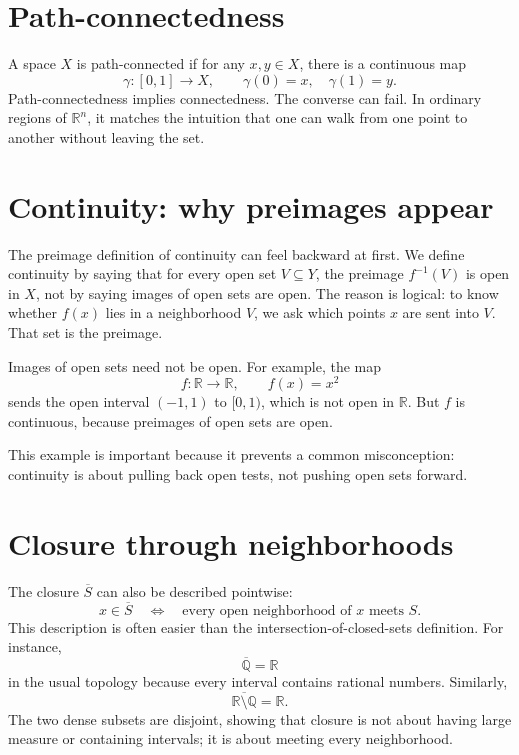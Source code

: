 \section{Path-connectedness}

A space \(X\) is path-connected if for any \(x,y\in X\), there is a continuous map
\[
  \gamma:[0,1]\to X,\qquad \gamma(0)=x,\quad \gamma(1)=y.
\]
Path-connectedness implies connectedness.  The converse can fail.  In ordinary regions of \(\mathbb R^n\), it matches the intuition that one can walk from one point to another without leaving the set.


\section{Continuity: why preimages appear}

The preimage definition of continuity can feel backward at first.  We define continuity by saying that for every open set \(V\subseteq Y\), the preimage \(f^{-1}(V)\) is open in \(X\), not by saying images of open sets are open.  The reason is logical: to know whether \(f(x)\) lies in a neighborhood \(V\), we ask which points \(x\) are sent into \(V\).  That set is the preimage.

Images of open sets need not be open.  For example, the map
\[
  f:\mathbb R\to\mathbb R,\qquad f(x)=x^2
\]
sends the open interval \((-1,1)\) to \([0,1)\), which is not open in \(\mathbb R\).  But \(f\) is continuous, because preimages of open sets are open.

This example is important because it prevents a common misconception: continuity is about pulling back open tests, not pushing open sets forward.

\section{Closure through neighborhoods}

The closure \(\overline S\) can also be described pointwise:
\[
  x\in\overline S
  \quad\Longleftrightarrow\quad
  \text{every open neighborhood of }x\text{ meets }S.
\]
This description is often easier than the intersection-of-closed-sets definition.  For instance,
\[
  \overline{\mathbb Q}=\mathbb R
\]
in the usual topology because every interval contains rational numbers.  Similarly,
\[
  \overline{\mathbb R\setminus\mathbb Q}=\mathbb R.
\]
The two dense subsets are disjoint, showing that closure is not about having large measure or containing intervals; it is about meeting every neighborhood.

